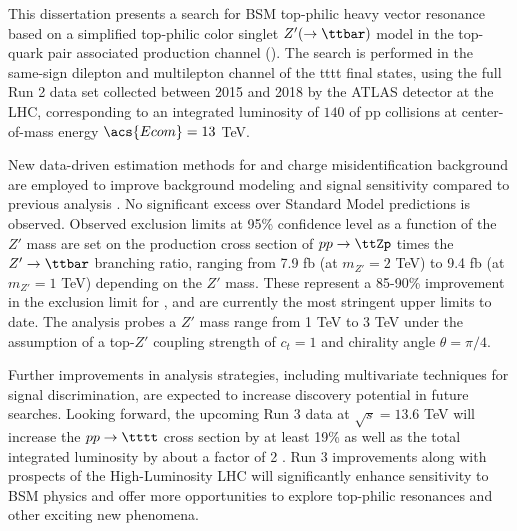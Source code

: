 \documentclass[../thesis.tex]{subfiles}
\begin{document}
\vspace{-1\baselineskip}

This dissertation presents a search for \acs{BSM} top-philic heavy vector resonance based on a simplified top-philic color singlet $Z'(\rightarrow\ttbar)$ model in the top-quark pair associated production channel (\ttZp). The search is performed in the same-sign dilepton and multilepton channel of the \acs{tttt} final states, using the full Run 2 data set collected between 2015 and 2018 by the \acs{ATLAS} detector at the \acs{LHC}, corresponding to an integrated luminosity of $140$ \fb of \acs{pp} collisions at center-of-mass energy $\acs{Ecom}=13$ TeV.

New data-driven estimation methods for \ttW and charge misidentification background are employed to improve background modeling and signal sensitivity compared to previous analysis \citep{theory:ttZp_1los}. No significant excess over Standard Model predictions is observed. Observed exclusion limits at 95\% confidence level as a function of the $Z'$ mass are set on the production cross section of $pp\rightarrow\ttZp$ times the $Z'\rightarrow\ttbar$ branching ratio, ranging from 7.9 fb (at $m_{Z'}=2$ TeV) to 9.4 fb (at $m_{Z'}=1$ TeV) depending on the $Z'$ mass. These represent a 85-90\% improvement in the exclusion limit for \ttZp, and are currently the most stringent upper limits to date. The analysis probes a $Z'$ mass range from 1 TeV to 3 TeV under the assumption of a top-$Z'$ coupling strength of $c_t=1$ and chirality angle $\theta=\pi/4$.

Further improvements in analysis strategies, including multivariate techniques for signal discrimination, are expected to increase discovery potential in future searches. Looking forward, the upcoming Run 3 data at $\sqrt{s} = 13.6$ TeV will increase the $pp\rightarrow\tttt$ cross section by at least 19\% \citep{PhysRevLett.131.211901} as well as the total integrated luminosity by about a factor of 2 \citep{ATL-DAPR-PUB-2023-001}. Run 3 improvements along with prospects of the High-Luminosity \acs{LHC} will significantly enhance sensitivity to \acs{BSM} physics and offer more opportunities to explore top-philic resonances and other exciting new phenomena. 
\end{document}
